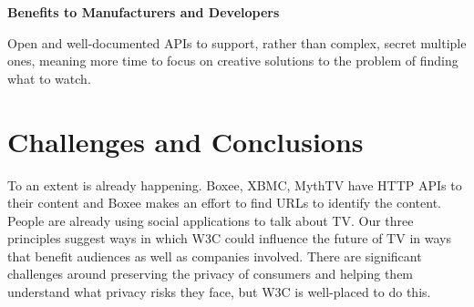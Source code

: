 \documentclass[]{article}%
\begin{document}
{\bf{Benefits to Manufacturers and Developers}}

Open and well-documented APIs to support, rather than complex, secret multiple ones, meaning more time to focus on creative solutions to the problem of finding what to watch.

\section{Challenges and Conclusions}

To an extent is already happening. Boxee, XBMC, MythTV have HTTP APIs to their content and Boxee makes an effort to find URLs to identify the content. People are already using social applications to talk about TV. Our three principles suggest ways in which W3C could influence the future of TV in ways that benefit audiences as well as companies involved. There are significant challenges around preserving the privacy of consumers and helping them understand what privacy risks they face, but W3C is well-placed to do this.
\end{document}
